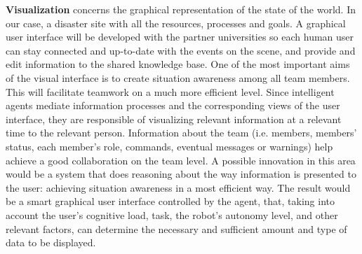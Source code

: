 \textbf{Visualization} concerns the graphical representation of the state of the world. In our case, a disaster site with all the resources, processes and goals. A graphical user interface will be developed with the partner universities so each human user can stay connected and up-to-date with the events on the scene, and provide and edit information to the shared knowledge base. One of the most important aims of the visual interface is to create situation awareness among all team members. This will facilitate teamwork on a much more efficient level.
Since intelligent agents mediate information processes and the corresponding views of the user interface, they are responsible of visualizing relevant information at a relevant time to the relevant person. Information about the team (i.e. members, members' status, each member's role, commands, eventual messages or warnings) help achieve a good collaboration on
the team level. A possible innovation in this area would be a system that does reasoning about the way information is presented to the user: achieving situation awareness in a most efficient way. The result would be a smart graphical user interface controlled by the agent, that, taking into account the user's cognitive load, task, the robot's autonomy level, and other relevant factors, can determine the necessary and sufficient amount and type of data to be displayed.



    
    
    
  
  
  
  
  
  